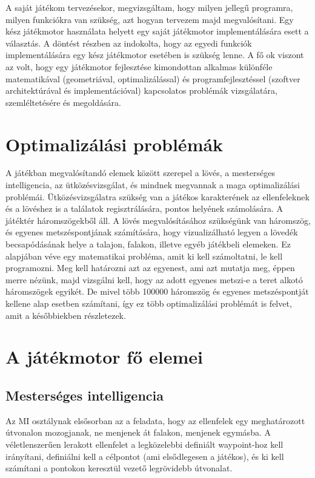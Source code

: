 A saját játékom tervezésekor, megvizsgáltam, hogy milyen jellegű programra, milyen funkciókra van szükség, azt hogyan tervezem majd megvalósítani. Egy kész játékmotor használata helyett egy saját játékmotor implementálására esett a választás. A döntést részben az indokolta, hogy az egyedi funkciók implementálására egy kész játékmotor esetében is szükség lenne. A fő ok viszont az volt, hogy egy játékmotor fejlesztése kimondottan alkalmas különféle matematikával (geometriával, optimalizálással) és programfejlesztéssel (szoftver architektúrával és implementációval)  kapcsolatos problémák vizsgálatára, szemléltetésére és megoldására.

\section{Optimalizálási problémák}

A játékban megvalósítandó elemek között szerepel a lövés, a mesterséges intelligencia, az ütközésvizsgálat, és mindnek megvannak a maga optimalizálási problémái. Ütközésvizsgálatra szükség van a játékos karakterének az ellenfeleknek és a lövéshez is a találatok regisztrálására, pontos helyének számolására. A játéktér háromszögekből áll. A lövés megvalósításához szükségünk van háromszög, és egyenes metszéspontjának számítására, hogy vizualizálható legyen a lövedék becsapódásának helye a talajon, falakon, illetve egyéb játékbeli elemeken. Ez alapjában véve egy matematikai probléma, amit ki kell számoltatni, le kell programozni. Meg kell határozni azt az egyenest, ami azt mutatja meg, éppen merre nézünk, majd vizsgálni kell, hogy az adott egyenes metszi-e a teret alkotó háromszögek egyikét. De mivel több 100000 háromszög és egyenes metszéspontját kellene alap esetben számítani, így ez több optimalizálási problémát is felvet, amit a későbbiekben részletezek.

\section{A játékmotor fő elemei}

\subsection{Mesterséges intelligencia}


Az MI osztálynak elsősorban az a feladata, hogy az ellenfelek egy meghatározott útvonalon mozogjanak, ne menjenek át falakon, menjenek egymásba. A véletlenszerűen lerakott ellenfelet a legközelebbi definiált waypoint-hoz kell irányítani, definiálni kell a célpontot (ami elsődlegesen a játékos), és ki kell számítani a pontokon keresztül vezető legrövidebb útvonalat.

